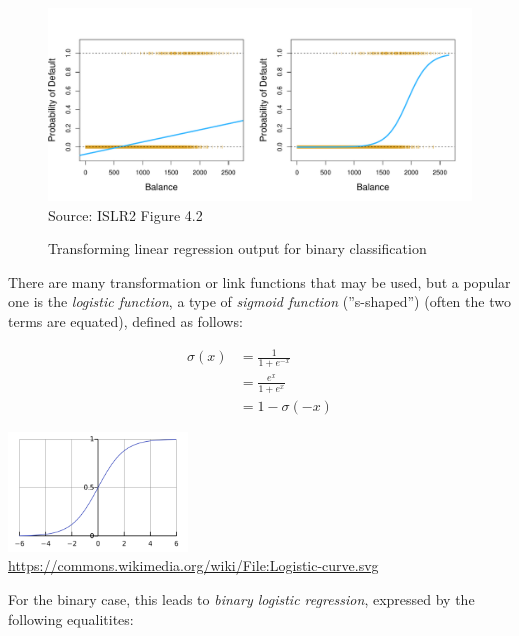 \begin{figure}
\centering
\includegraphics[width=\textwidth]{../class11/Figures_Chapters_1-6/Chapter4/4_2.pdf}
\scriptsize Source: ISLR2 Figure 4.2

\caption{Transforming linear regression output for binary classification}
\label{fig:classification1}
\end{figure}

There are many transformation or link functions that may be used, but a popular one is the \emph{logistic function}, a type of \emph{sigmoid function} (''s-shaped'') (often the two terms are equated), defined as follows:

\begin{minipage}{.4\textwidth}
\begin{align*}
  \sigma(x) &= \frac{1}{1 + e^{-x}} \\
  &= \frac{e^x}{1 + e^x} \\
  &= 1 - \sigma(-x)
\end{align*}
\end{minipage}
\begin{minipage}{.6\textwidth}
\centering
\includegraphics[height=1.25in]{logistic.png} \\

\tiny \url{https://commons.wikimedia.org/wiki/File:Logistic-curve.svg} \normalsize
\end{minipage}

For the binary case, this leads to \emph{binary logistic regression}, expressed by the following equalitites:

